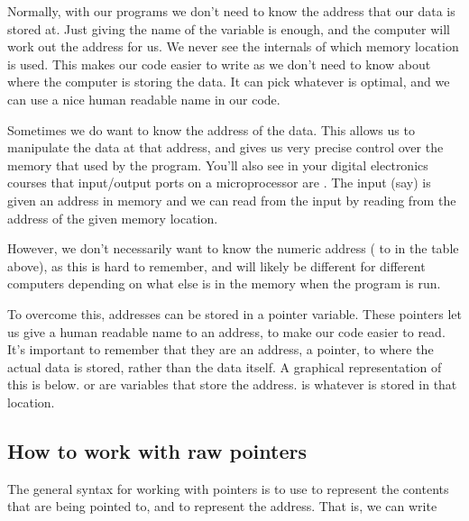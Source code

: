 \documentclass[letterpaper,10pt,british]{sphinxmanual}
\let\sphinxpxdimen\pdfpxdimen\else\newdimen\sphinxpxdimen
\begin{document}
\sphinxAtStartPar
Normally, with our programs we don’t need to know the address that our data is stored at. Just giving the name of the variable is enough, and the computer will work out the address for us. We never see the internals of which memory location is used. This makes our code easier to write as we don’t need to know about where the computer is storing the data. It can pick whatever is optimal, and we can use a nice human readable name in our code.

\sphinxAtStartPar
Sometimes we do want to know the address of the data. This allows us to manipulate the data at that address, and gives us very precise control over the memory that used by the program. You’ll also see in your digital electronics courses that input/output ports on a microprocessor are . The input (say) is given an address in memory and we can read from the input by reading from the address of the given memory location.

\sphinxAtStartPar
However, we don’t necessarily want to know the numeric address ( to  in the table above), as this is hard to remember, and will likely be different for different computers depending on what else is in the memory when the program is run.

\sphinxAtStartPar
To overcome this, addresses can be stored in a pointer variable. These pointers let us give a human readable name to an address, to make our code easier to read. It’s important to remember that they are an address, a pointer, to where the actual data is stored, rather than the data itself. A graphical representation of this is below.  or  are variables that store the address.  is whatever is stored in that location.

\begin{figure}[htbp]
\centering

\noindent\sphinxincludegraphics[width=600\sphinxpxdimen]{{pointers}.png}
\end{figure}


\subsection{How to work with raw pointers}
\label{\detokenize{chapters/programming_fundamentals/pointers:how-to-work-with-raw-pointers}}
\sphinxAtStartPar
The general syntax for working with pointers is to use  to represent the contents that are being pointed to, and  to represent the address. That is, we can write
\end{document}
